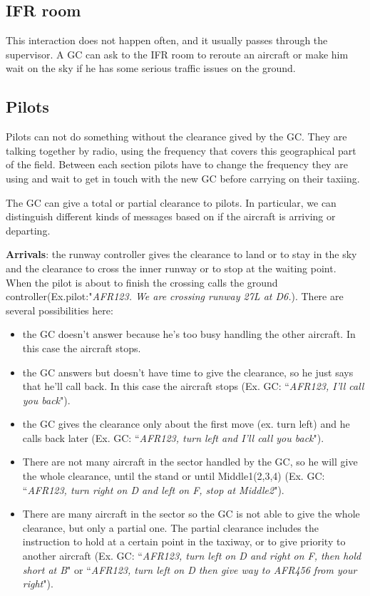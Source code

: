 \documentclass{article}
\begin{document}
\subsection{IFR room}
This interaction does not happen often, and it usually passes through the supervisor. A GC can ask to the IFR room to reroute an aircraft or make him wait on the sky if he has some serious traffic issues on the ground.

\subsection{Pilots}
Pilots can not do something without the clearance gived by the GC. 
They are talking together by radio, using the frequency that covers this geographical part of the field. Between each section pilots have to change the frequency they are using and wait to get in touch with the new GC before carrying on their taxiing. 

The GC can give a total or partial clearance to pilots. In particular, we can distinguish different kinds of messages based on if the aircraft is arriving or departing.

\textbf{Arrivals}: the runway controller gives the clearance to land or to stay in the sky and the clearance to cross the inner runway or to stop at the waiting point. When the pilot is about to finish the crossing calls the ground controller(Ex.pilot:"\textit{AFR123. We are crossing runway 27L at D6.}). There are several possibilities here:
\begin{itemize}
	\item the GC doesn't answer because he's too busy handling the other aircraft. In this case the aircraft stops.
	\item the GC answers but doesn't have time to give the clearance, so he just says that he'll call back. In this case the aircraft stops (Ex. GC: ``\textit{AFR123, I'll call you back}").
	\item the GC gives the clearance only about the first move (ex. turn left) and he calls back later (Ex. GC: ``\textit{AFR123, turn left and I'll call you back}").
	\item There are not many aircraft in the sector handled by the GC, so he will give the whole clearance, until the stand or until Middle1(2,3,4) (Ex. GC: ``\textit{AFR123, turn right on D and left on F, stop at Middle2}").
	\item There are many aircraft in the sector so the GC is not able to give the whole clearance, but only a partial one. The partial clearance includes the instruction to hold at a certain point in the taxiway, or to give priority to another aircraft (Ex. GC: ``\textit{AFR123, turn left on D and right on F, then hold short at B}" or ``\textit{AFR123, turn left on D then give way to AFR456 from your right}").
\end{itemize}
\end{document}
